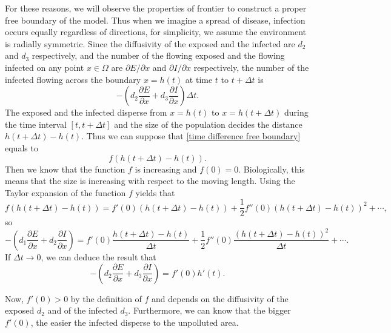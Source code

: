 \documentclass[11pt]{amsart}
\numberwithin{equation}{section}
\theoremstyle{plain}
\theoremstyle{definition}
\begin{document}
 	For these reasons, we will observe the properties of frontier to construct a proper free boundary of the model. Thus when we imagine a spread of disease, infection occurs equally regardless of directions, for simplicity, we assume the environment is radially symmetric. Since the diffusivity of the exposed and the infected are $d_2$ and $d_3$ respectively, and the number of the flowing exposed and the flowing infected on any point $x\in \Omega$ are $\partial E/ \partial x$ and $\partial I/ \partial x$ respectively, the number of the infected flowing across the boundary $x=h(t)$ at time $t$ to $t+\Delta t$ is 
 	\begin{equation} \label{time difference free boundary}
 		-\left(d_2 \frac{\partial E}{\partial x}+d_3 \frac{\partial I}{\partial x}\right) \Delta t.
 	\end{equation}
 	The exposed and the infected disperse from $x=h(t)$ to $x=h(t+\Delta t)$ during the time interval $[t,t+\Delta t]$ and the size of the population decides the distance $h(t+\Delta t)-h(t)$. Thus we can suppose that \cref{time difference free boundary} equals to
 	\begin{equation*}
 		f(h(t+\Delta t)-h(t)).
 	\end{equation*}
 	Then we know that the function $f$ is increasing and $f(0)=0$. Biologically, this means that the size is increasing with respect to the moving length. Using the Taylor expansion of the function $f$ yields that
 	\begin{equation*}
 		f(h(t+\Delta t)-h(t))=f'(0)(h(t+\Delta t)-h(t))+\textstyle\frac{1}{2}f''(0)(h(t+\Delta t)-h(t))^2+\cdots,
 	\end{equation*}
 	so
 	\begin{equation*}
 		-\left(d_1 \frac{\partial E}{\partial x}+d_2 \frac{\partial I}{\partial x}\right)=f'(0) \frac{h(t+\Delta t)-h(t)}{\Delta t}+\frac{1}{2}f''(0)\frac{(h(t+\Delta t)-h(t))^2}{\Delta t}+ \cdots.
 	\end{equation*}
 	If $\Delta t \to 0$, we can deduce the result that
 	\begin{equation*}
 		-\left(d_2 \frac{\partial E}{\partial x}+d_3 \frac{\partial I}{\partial x}\right)=f'(0)h'(t).
 	\end{equation*}
 	
 	Now, $f'(0)>0$ by the definition of $f$ and depends on the diffusivity of the exposed $d_2$ and of the infected $d_3$. Furthermore, we can know that the bigger $f'(0)$, the easier the infected disperse to the unpolluted area.
 	
\end{document}
